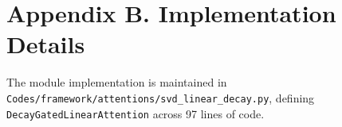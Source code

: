 \section*{Appendix B. Implementation Details}
The module implementation is maintained in \texttt{Codes/framework/attentions/svd\_linear\_decay.py}, defining \texttt{DecayGatedLinearAttention} across 97 lines of code.
